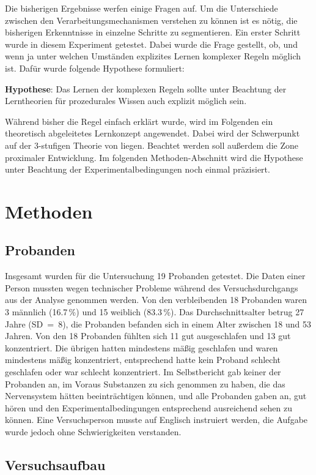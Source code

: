 \documentclass[doc,a4paper,12pt]{apa6}
\begin{document}
Die bisherigen Ergebnisse werfen einige Fragen auf. Um die Unterschiede zwischen den Verarbeitungsmechanismen verstehen zu können ist es nötig, die bisherigen Erkenntnisse in einzelne Schritte zu segmentieren. Ein erster Schritt wurde in diesem Experiment getestet. Dabei wurde die Frage gestellt, ob, und wenn ja unter welchen Umständen explizites Lernen komplexer Regeln möglich ist. Dafür wurde folgende Hypothese formuliert:

\textbf{Hypothese}: Das Lernen der komplexen Regeln sollte unter Beachtung der Lerntheorien für prozedurales Wissen auch explizit möglich sein.

Während bisher die Regel einfach erklärt wurde, wird im Folgenden ein theoretisch abgeleitetes Lernkonzept angewendet. Dabei wird der Schwerpunkt auf der 3-stufigen Theorie von \textcite{fitts1967human} liegen. Beachtet werden soll außerdem die Zone proximaler Entwicklung. Im folgenden Methoden-Abschnitt wird die Hypothese unter Beachtung der Experimentalbedingungen noch einmal präzisiert.

\section{Methoden}

\subsection{Probanden}

Insgesamt wurden für die Untersuchung 19 Probanden getestet. Die Daten einer Person mussten wegen technischer Probleme während des Versuchsdurchgangs aus der Analyse genommen werden. Von den verbleibenden 18 Probanden waren 3 männlich (16.7\,\%) und 15 weiblich (83.3\,\%). Das Durchschnittsalter betrug 27 Jahre (SD~=~8), die Probanden befanden sich in einem Alter zwischen 18 und 53 Jahren. Von den 18 Probanden fühlten sich 11 gut ausgeschlafen und 13 gut konzentriert. Die übrigen hatten mindestens mäßig geschlafen und waren mindestens mäßig konzentriert, entsprechend hatte kein Proband schlecht geschlafen oder war schlecht konzentriert. Im Selbstbericht gab keiner der Probanden an, im Voraus Substanzen zu sich genommen zu haben, die das Nervensystem hätten beeinträchtigen können, und alle Probanden gaben an, gut hören und den Experimentalbedingungen entsprechend ausreichend sehen zu können. Eine Versuchsperson musste auf Englisch instruiert werden, die Aufgabe wurde jedoch ohne Schwierigkeiten verstanden.

\subsection{Versuchsaufbau}
\end{document}
